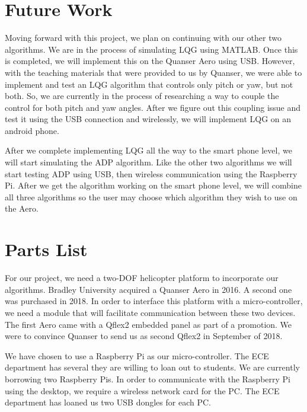 \documentclass[letterpaper, 10pt, conference]{ieeeconf}
\begin{document}

\section{Future Work}
Moving forward with this project, we plan on continuing with our other two algorithms.  We are in the process of simulating LQG using MATLAB.  Once this is completed, we will implement this on the Quanser Aero using USB. However, with the teaching materials that were provided to us by Quanser, we were able to implement and test an LQG algorithm that controls only pitch or yaw, but not both.  So, we are currently in the process of researching a way to couple the control for both pitch and yaw angles.  After we figure out this coupling issue and test it using the USB connection and wirelessly, we will implement LQG on an android phone.

After we complete implementing LQG all the way to the smart phone level, we will start simulating the ADP algorithm.  Like the other two algorithms we will start testing ADP using USB, then wireless communication using the Raspberry Pi.  After we get the algorithm working on the smart phone level, we will combine all three algorithms so the user may choose which algorithm they wish to use on the Aero.


\section{Parts List}
For our project, we need a two-DOF helicopter platform to incorporate our algorithms.  Bradley University acquired a Quanser Aero in 2016.  A second one was purchased in 2018.  In order to interface this platform with a micro-controller, we need a module that will facilitate communication between these two devices.  The first Aero came with a Qflex2 embedded panel as part of a promotion.  We were to convince Quanser to send us as second Qflex2 in September of 2018.

We have chosen to use a Raspberry Pi as our micro-controller.  The ECE department has several they are willing to loan out to students.  We are currently borrowing two Raspberry Pis.  In order to communicate with the Raspberry Pi using the desktop, we require a wireless network card for the PC.  The ECE department has loaned us two USB dongles for each PC.
\end{document}
